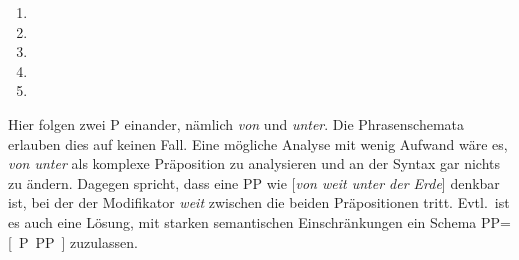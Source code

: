 \begin{enumerate}
  \item {}
  \item {}
  \item {}
  \item {}
  \item {}
\end{enumerate}


Hier folgen zwei P einander, nämlich \textit{von} und \textit{unter}.
Die Phrasenschemata erlauben dies auf keinen Fall.
Eine mögliche Analyse mit wenig Aufwand wäre es, \textit{von unter} als komplexe Präposition zu analysieren und an der Syntax gar nichts zu ändern.
Dagegen spricht, dass eine PP wie [\textit{von weit unter der Erde}] denkbar ist, bei der der Modifikator \textit{weit} zwischen die beiden Präpositionen tritt.
Evtl.\ ist es auch eine Lösung, mit starken semantischen Einschränkungen ein Schema PP=[~P~PP~] zuzulassen.


